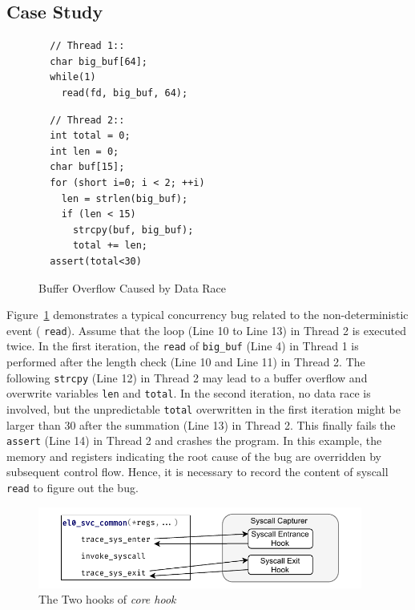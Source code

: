\subsection{Case Study}

\begin{figure}
    \begin{minipage}[t]{0.46\textwidth}
      \begin{lstlisting}
  // Thread 1::
  char big_buf[64];
  while(1)
    read(fd, big_buf, 64);
      \end{lstlisting}    
    \end{minipage}
    \begin{minipage}[t]{0.46\textwidth}
      \lstset{firstnumber=last}
      \begin{lstlisting}
  // Thread 2::
  int total = 0;
  int len = 0;
  char buf[15];
  for (short i=0; i < 2; ++i)
    len = strlen(big_buf);
    if (len < 15)
      strcpy(buf, big_buf);
      total += len;
  assert(total<30)
    \end{lstlisting}    
    \end{minipage}
  
  
    \caption{Buffer Overflow Caused by Data Race}
    \label{fig:data-race}
\end{figure}

Figure~\ref{fig:data-race} demonstrates a typical concurrency
bug related to the non-deterministic event
(\syscall{} \texttt{read}). Assume that the loop (Line 10 to Line 13) in Thread 2
is executed twice. In the first iteration, the \texttt{read} of 
\texttt{big\_buf} (Line 4) in Thread 1 is performed after the length 
check (Line 10 and Line 11) in Thread 2. The following \texttt{strcpy} (Line 12) in 
Thread 2 may lead to a buffer overflow and overwrite variables \texttt{len} and 
\texttt{total}. In the second iteration, no data race is involved, but the 
unpredictable \texttt{total} overwritten in the first iteration might be larger
than 30 after the summation (Line 13) in Thread 2. This finally fails the
\texttt{assert} (Line 14) in Thread 2 and crashes the program.
In this example, the memory and registers indicating the root cause of
the bug are overridden by subsequent control flow. 
Hence, it is necessary to record the content of syscall \texttt{read} to figure out the bug.


\begin{figure}
    \centering
    \includegraphics[width=0.95\textwidth]{figures/syscall_capturer.pdf}
    \caption{The Two hooks of \textit{core hook}}
    \label{fig:core-hook-desgin}
\end{figure}

